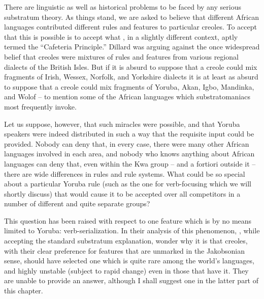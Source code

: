 There are linguistic as well as historical problems to be faced by any serious substratum theory. As things stand, we are asked to believe that different African languages contributed different rules and features to particular creoles. To accept that this is possible is to accept what \citet{Dillard1970}, in a slightly different context, aptly termed the ``Cafe\-teria Principle.'' Dillard was arguing against the once widespread belief that creoles were mixtures of rules and features from various regional dialects of the British Isles. But if it is absurd to suppose that a creole could mix fragments of Irish, Wessex, Norfolk, and Yorkshire dialects it is at least as absurd to suppose that a creole could mix fragments of Yoruba, Akan, Igbo, Mandinka, and Wolof -- to mention some of the African languages which substratomaniacs most frequently invoke.

Let us suppose, however, that such miracles were possible, and that Yoruba speakers were indeed distributed in such a way that the
requisite input could be provided. Nobody can deny that, in every case, there were many other African languages involved in each area, and nobody who knows anything about African languages can deny that, even within the Kwa group -- and a fortiori outside it -- there are wide differences in rules and rule systems. What could be so special about a particular Yoruba rule (such as the one for verb-focusing which we will shortly discuss) that would cause it to be accepted over all compe\-titors in a number of different and quite separate groups?

This question has been raised with respect to one feature which is by no means limited to Yoruba: verb-serialization. In their analysis of this phenomenon, \citet{JansenEtAl1978}, while accepting the standard substratum explanation, wonder why it is that creoles, with their clear preference for features that are unmarked in the Jakobsonian sense, should have selected one which is quite rare among the world's languages, and highly unstable (subject to rapid change) even in those that have it. They are unable to provide an answer, although I shall suggest one in the latter part of this chapter.

